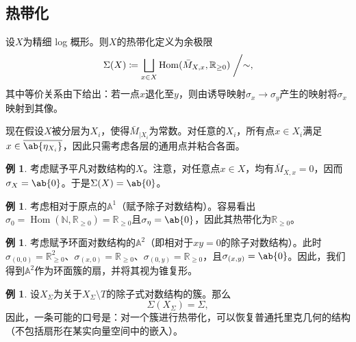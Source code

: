 \documentclass{amsart}
\theoremstyle{definition}
\newtheorem{exm}[thm]{例}
\theoremstyle{remark}
\theoremstyle{plain}
\theoremstyle{definition}
\theoremstyle{remark}
\newcommand{\A}{\mathbb{A}}
\newcommand{\N}{\mathbb{N}}
\newcommand{\R}{\mathbb{R}}
\newcommand{\ol}[1]{\overline{#1}}
\newcommand{\1}{\mathbf{1}}
\newcommand{\2}{\mathbf{2}}
\newcommand{\3}{\mathbf{3}}
\DeclareMathOperator{\Hom}{Hom}
\begin{document}
\subsection{热带化}%
\label{sub:Tropicalization}

设\(X\)为精细 log 概形。则\(X\)的热带化定义为余极限
\[\Sigma(X) \coloneqq \bigsqcup_{x \in X} \Hom(\bar{M}_{X,x}, \R_{\geq 0}) \biggm/ \sim, \]
其中等价关系由下给出：若一点\(x\)退化至\(y\)，则由诱导映射\(\sigma_x \to \sigma_y\)产生的映射将\(\sigma_x\)映射到其像。

现在假设\(X\)被分层为\(X_i\)，使得\(\bar{M}_{|X_i}\)为常数。对任意的\(X_i\)，所有点\(x \in X_i\)满足\(x \in \ol{\ab\{\eta_{X_i}\}}\)，因此只需考虑各层的通用点并粘合各面。

\begin{exm}
    考虑赋予平凡对数结构的\(X\)。注意，对任意点\(x \in X\)，均有\(\bar{M}_{X,x} = 0\)，因而\(\sigma_X = \ab\{0\}\)。于是\(\Sigma(X) = \ab\{0\}\)。
\end{exm}

\begin{exm}
    考虑相对于原点的\(\A^1\)（赋予除子对数结构）。容易看出\(\sigma_0 = \Hom(\N, \R_{\geq 0}) = \R_{\geq 0}\)且\(\sigma_{\eta} = \ab\{0\}\)，因此其热带化为\(\R_{\geq 0}\)。
\end{exm}

\begin{exm}
    考虑赋予环面对数结构的\(\A^2\)（即相对于\(xy = 0\)的除子对数结构）。此时\(\sigma_{(0,0)} = \R^2_{\geq 0}\)、\(\sigma_{(x,0)} = \R_{\geq 0}\)、\(\sigma_{(0,y)} = \R_{\geq 0}\)，且\(\sigma_{(x,y)} = \ab\{0\}\)。因此，我们得到\(\A^2\)作为环面簇的扇，并将其视为锥复形。
\end{exm}

\begin{exm}
    设\(X_{\Sigma}\)为关于\(X_{\Sigma} \setminus T\)的除子式对数结构的簇。那么
    \[ \Sigma(X_{\Sigma}) = \Sigma, \]
因此，一条可能的口号是：对一个簇进行热带化，可以恢复普通托里克几何的结构（不包括扇形在某实向量空间中的嵌入）。
\end{exm}
\end{document}
